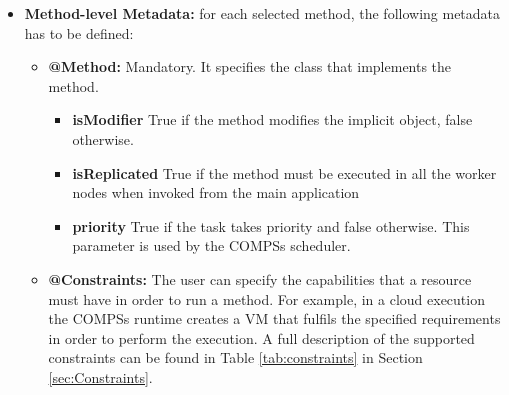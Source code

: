 \begin{itemize}
 \item {\bf Method-level Metadata:} for each selected method, the following metadata has to be defined:
       \begin{itemize}
         \item {\bf @Method:} Mandatory. It specifies the class that implements the method.
		\begin{itemize}
			\item \textbf{isModifier} True if the method modifies the implicit object, false otherwise.
			\item \textbf{isReplicated} True if the method must be executed in all the worker nodes when invoked from the main application
			\item \textbf{priority} True if the task takes priority and false otherwise. This parameter is used by the COMPSs scheduler. 
		\end{itemize}
         \item {\bf @Constraints:} The user can specify the capabilities that a resource must have in order
               to run a method. For example, in a cloud execution the COMPSs runtime creates a VM that fulfils the
               specified requirements in order to perform the execution. A full description of the supported constraints
               can be found in Table \ref{tab:constraints} in Section \ref{sec:Constraints}.
       \end{itemize}


\end{itemize}
